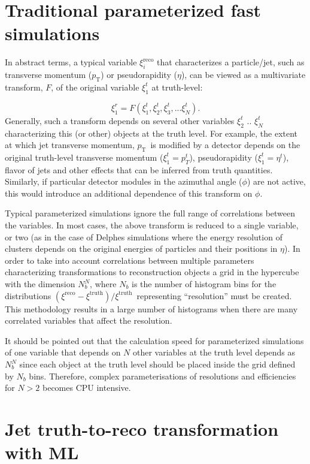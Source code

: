 \documentclass[showpacs,showkeys,preprint,prd,nofootinbib,linenumbers,12pt,superscriptaddress]{revtex4-1}
\def\pt{\ensuremath{p_{\mathrm{T}}}}
\def\genRes{\ensuremath{(\xi^{\mathrm{reco}}-\xi^{\mathrm{truth}})/\xi^{\mathrm{truth}}}}
\begin{document}
\section{Traditional parameterized fast simulations}

In abstract terms, a typical variable $\xi_i^{\mathrm{reco}}$ that characterizes a particle/jet, such as transverse momentum (\pt) or pseudorapidity ($\eta$), can be viewed as a multivariate transform, $F$, of the original variable $\xi_1^t$ at truth-level:

$$
\xi_1^r = F (\xi_1^t, \xi_2^t, \xi_3^t, ...\xi_N^t).
$$
Generally, such a transform  depends on several other variables $\xi_2^t$ ..  $\xi_N^t$ characterizing this (or other) objects at the truth level. For example, the extent at which jet transverse momentum, \pt\ is modified by a detector depends on the original truth-level transverse momentum ($\xi_1^t=p_T^t$), pseudorapidity ($\xi_1^t=\eta^t$), flavor of jets and other effects that can be inferred from truth quantities. Similarly, if particular detector modules in the azimuthal angle ($\phi$) are not active, this would introduce an additional dependence of this transform on $\phi$.

Typical parameterized simulations ignore the full range of correlations between the variables. In most cases, the above transform is reduced to a single variable, or two (as in the case of Delphes simulations where the energy resolution of clusters depends on the original energies of particles and their positions in $\eta$). In order to take into account correlations between multiple parameters characterizing transformations to reconstruction objects a grid in the hypercube with the dimension $N_b^N$, where $N_b$ is the number of histogram bins for the distributions \genRes\ representing ``resolution'' must be created. This methodology results in a large number of histograms when there are many correlated variables that affect the resolution.

It should be pointed out that the calculation speed for parameterized simulations of one variable that depends on $N$ other variables at the truth level depends  as $N_b^N$ since each object at the truth level should be placed inside the grid defined by $N_b$ bins. Therefore, complex parameterisations of resolutions and efficiencies for $N>2$ becomes CPU intensive. 

\section{Jet truth-to-reco transformation with ML}
\end{document}
